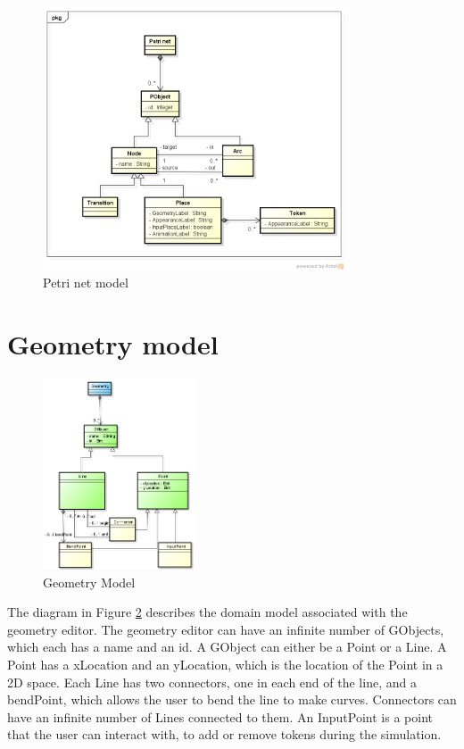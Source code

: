 \documentclass[11pt]{article}   %
\begin{document}
\begin{figure}[htp]
\begin{center}
  \includegraphics[width=0.8\textwidth]{image/petrinet.png}
  \caption{Petri net model}
  \label{fig:petrinet}
\end{center}
\end{figure}

\newpage
\section{Geometry model}


\begin{figure}[htp]
\begin{center}
  \includegraphics[width=0.4\textwidth]{image/geometry_model.png}
  \caption{Geometry Model}
  \label{fig:geometry_model}
\end{center}
\end{figure}

The diagram in Figure \ref{fig:geometry_model} describes the domain model associated with the geometry editor. The geometry editor can have an infinite number of GObjects, which each has a name and an id. A GObject can either be a Point or a Line. A Point has a xLocation and an yLocation, which is the location of the Point in a 2D space.
Each Line has two connectors, one in each end of the line, and a bendPoint, which allows the user to bend the line to make curves. Connectors can have an infinite number of Lines connected to them. An InputPoint is a point that the user can interact with, to add or remove tokens during the simulation. 
\end{document}
